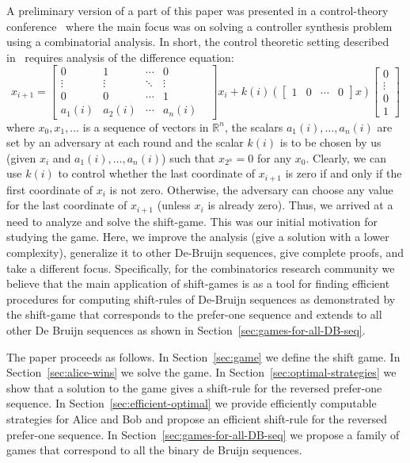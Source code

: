\documentclass[final,12pt]{elsarticle}
\theoremstyle{definition} \newtheorem{definition}[theorem]{Definition} \newtheorem{observation}[theorem]{Observation} \newtheorem{example}[theorem]{Example} \newtheorem{remark}[theorem]{Remark} \newtheorem{corrolary}[theorem]{Corrolary}
\newcommand{\R}{{\mathbb{R}}} \newcommand{\N}{{\mathbb{N}}} \newcommand{\C}{{\mathbb{C}}} \newcommand{\Z}{{\mathbb{Z}}}
\newcommand{\REF}[2]{#1~\ref{#2}}
\begin{document}
\def \A {\begin{bmatrix}
		0 & 1 & \cdots & 0 \\
		\vdots & \vdots & \ddots & \vdots & \\
		0 & 0 & \cdots & 1 \\
		a_1(i) & a_2(i) & \cdots & a_{n}(i) 
\end{bmatrix}}


\def \B {\begin{bmatrix}
		0 \\ \vdots \\ 0 \\ 1
\end{bmatrix}}

\def \C {\begin{bmatrix}
		1 & 0 & \cdots & 0
\end{bmatrix}}


A preliminary version of a part of this paper was presented in  a control-theory conference~\cite{weiss2007combinatorial} where the main focus was on solving a controller synthesis problem using a combinatorial analysis. In short, the control theoretic setting described in~\cite{weiss2007combinatorial} requires analysis of the difference equation: 
$$x_{i+1} = \A x_i +  k(i) (\C x) \B $$
where $x_0,x_1,\dots$ is a sequence of vectors in $\R^n$, the scalars $a_1(i),\dots,a_n(i)$ are set by an adversary at each round and the scalar $k(i)$ is to be chosen by us (given $x_i$ and $a_1(i),\dots,a_n(i)$) such that $x_{2^n}=0$ for any $x_0$. 
Clearly, we can use $k(i)$ to control whether the last coordinate of $x_{i+1}$ is zero if and only if the first coordinate of $x_i$ is not zero. Otherwise, the adversary can choose any value for the last coordinate of $x_{i+1}$ (unless $x_i$ is already zero). Thus, we arrived at a need to analyze and solve the shift-game. 
This was our initial motivation for studying the game. Here, we improve the analysis (give a solution with a lower complexity), generalize it to other De-Bruijn sequences, give complete proofs, and take a different focus. Specifically, for the combinatorics research community we believe that the main application of shift-games is as a tool for finding efficient procedures for computing shift-rules of De-Bruijn sequences as demonstrated by the shift-game that corresponds to the prefer-one sequence and extends to all other De Bruijn sequences as shown in \REF{Section}{sec:games-for-all-DB-seq}.

The paper proceeds as follows. In \REF{Section}{sec:game} we define the shift game. In \REF{Section}{sec:alice-wins} we solve the game. In \REF{Section}{sec:optimal-strategies} we show that a solution to the game gives a shift-rule for the reversed prefer-one sequence. In \REF{Section}{sec:efficient-optimal} we provide efficiently computable strategies for Alice and Bob and propose an efficient shift-rule for the reversed prefer-one sequence. In \REF{Section}{sec:games-for-all-DB-seq} we propose a family of games that correspond to all the binary de Bruijn sequences.
\end{document}

